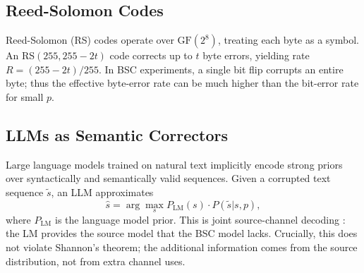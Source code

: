 \subsection{Reed-Solomon Codes}

Reed-Solomon (RS) codes \cite{reed_solomon1960} operate over $\text{GF}(2^8)$,
treating each byte as a symbol.  An RS$(255,255-2t)$ code corrects up to $t$
byte errors, yielding rate $R=(255-2t)/255$.  In BSC experiments, a single
bit flip corrupts an entire byte; thus the effective byte-error rate can be much
higher than the bit-error rate for small $p$.

\subsection{LLMs as Semantic Correctors}

Large language models trained on natural text implicitly encode strong priors
over syntactically and semantically valid sequences.  Given a corrupted text
sequence $\tilde{s}$, an LLM approximates
\begin{equation}
  \hat{s} = \arg\max_{s} P_\text{LM}(s)\cdot P(\tilde{s} | s, p),
\end{equation}
where $P_\text{LM}$ is the language model prior.  This is joint source-channel
decoding \cite{farsad2018deep}: the LM provides the source model that the BSC
model lacks.  Crucially, this does not violate Shannon's theorem; the additional
information comes from the source distribution, not from extra channel uses.
